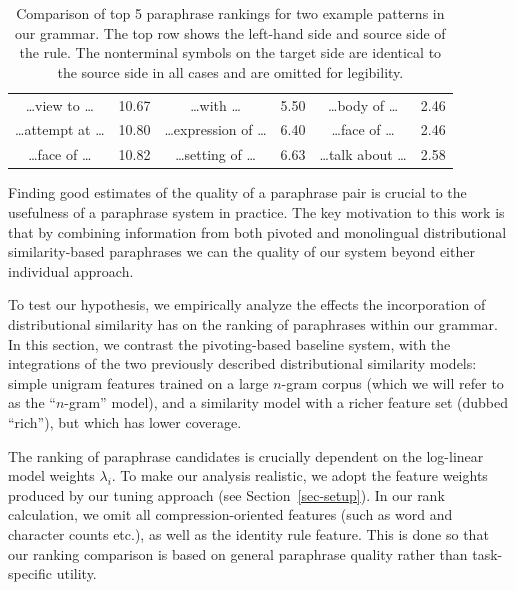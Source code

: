 \documentclass[11pt]{article}
\begin{document}
\begin{table}[!t]
\begin{center}
\begin{tabular}{|cr|cr|cr|}
  \ldots view to \ldots & 10.67 &
  \ldots with \ldots & 5.50 &
  \ldots body of \ldots & 2.46 \\

  \ldots attempt at \ldots & 10.80 &
  \ldots expression of \ldots & 6.40 &
  \ldots face of \ldots & 2.46 \\

  \ldots face of \ldots & 10.82 &
  \ldots setting of \ldots & 6.63 &
  \ldots talk about \ldots & 2.58 \\

  \hline
\end{tabular}
\end{center}
\normalsize
\caption{Comparison of top 5 paraphrase rankings for two example patterns in
  our grammar. The top row shows the left-hand side and source side of
  the rule. The nonterminal symbols on the target side are identical
  to the source side in all cases and are omitted for legibility.}
\label{tab-ranking}
\end{table}

Finding good estimates of the quality of a paraphrase pair is crucial
to the usefulness of a paraphrase system in practice. The key
motivation to this work is that by combining information from both
pivoted and monolingual distributional similarity-based paraphrases we
can the quality of our system beyond either individual approach.

To test our hypothesis, we empirically analyze the effects the
incorporation of distributional similarity has on the ranking of
paraphrases within our grammar. In this section, we contrast the
pivoting-based baseline system, with the integrations of the two
previously described distributional similarity models: simple unigram
features trained on a large $n$-gram corpus (which we will refer to as
the ``$n$-gram'' model), and a similarity model with a richer feature
set (dubbed ``rich''), but which has lower coverage.

The ranking of paraphrase candidates is crucially dependent on the
log-linear model weights $\lambda_i$. To make our analysis realistic,
we adopt the feature weights produced by our tuning approach (see
Section~\ref{sec-setup}). In our rank calculation, we omit all
compression-oriented features (such as word and character counts
etc.), as well as the identity rule feature. This is done so that our
ranking comparison is based on general paraphrase quality rather than
task-specific utility.
\end{document}

